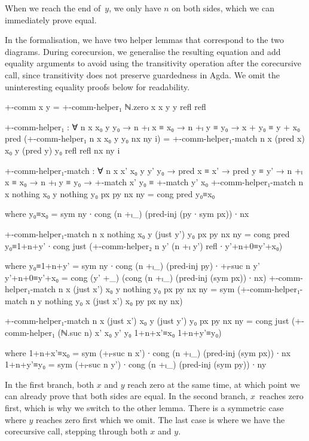 When we reach the end of~$y$, we only have $n$ on both sides, which we can
immediately prove equal.

In the formalisation, we have two helper lemmas that correspond to the two
diagrams. During corecursion, we generalise the resulting equation and add
equality arguments to avoid using the transitivity operation after the
corecursive call, since transitivity does not preserve guardedness in Agda. We omit
the uninteresting equality proofs below for readability.
\begin{AgdaSuppressSpace}
\begin{code}
  +-comm x y = +-comm-helper₁ ℕ.zero x x y y refl refl

  +-comm-helper₁ :
    ∀ n x x₀ y y₀ → n +ₗ x ≡ x₀ → n +ₗ y ≡ y₀ →
    x + y₀ ≡ y + x₀
  pred (+-comm-helper₁ n x x₀ y y₀ nx ny i) =
    +-comm-helper₁-match n x (pred x) x₀ y (pred y) y₀
      refl refl nx ny i

  +-comm-helper₁-match :
    ∀ n x x' x₀ y y' y₀ →
    pred x ≡ x' → pred y ≡ y' →
    n +ₗ x ≡ x₀ → n +ₗ y ≡ y₀ →
    +-match x' y₀ ≡ +-match y' x₀
  +-comm-helper₁-match
    n x nothing x₀ y nothing y₀ px py nx ny =
      cong pred y₀≡x₀
\end{code}
\begin{code}[hide]
      where
      y₀≡x₀ = sym ny ∙ cong (n +ₗ_) (pred-inj (py ∙ sym px)) ∙ nx
\end{code}
\begin{code}
  +-comm-helper₁-match
    n x nothing x₀ y (just y') y₀ px py nx ny =
      cong pred y₀≡1+n+y' ∙
      cong just
        (+-comm-helper₂ n y' (n +ₗ y') refl ∙ y'+n+0≡y'+x₀)
\end{code}
\begin{code}[hide]
    where
    y₀≡1+n+y' = sym ny ∙ cong (n +ₗ_) (pred-inj py) ∙ +ₗ-suc n y'
    y'+n+0≡y'+x₀ = cong (y' +_) (cong (n +ₗ_) (pred-inj (sym px)) ∙ nx)
  +-comm-helper₁-match
    n x (just x') x₀ y nothing y₀ px py nx ny =
      sym (+-comm-helper₁-match n y nothing y₀ x (just x') x₀ py px ny nx)
\end{code}
\begin{code}
  +-comm-helper₁-match
    n x (just x') x₀ y (just y') y₀ px py nx ny =
      cong just
        (+-comm-helper₁ (ℕ.suc n) x' x₀ y' y₀
          1+n+x'≡x₀ 1+n+y'≡y₀)
\end{code}
\begin{code}[hide]
    where
    1+n+x'≡x₀ = sym (+ₗ-suc n x') ∙ cong (n +ₗ_) (pred-inj (sym px)) ∙ nx
    1+n+y'≡y₀ = sym (+ₗ-suc n y') ∙ cong (n +ₗ_) (pred-inj (sym py)) ∙ ny
\end{code}
\end{AgdaSuppressSpace}
In the first branch, both $x$ and $y$ reach zero at the same time, at which
point we can already prove that both sides are equal. In the second branch,
$x$~reaches zero first, which is why we switch to the other lemma. There is a
symmetric case where $y$ reaches zero first which we omit. The last case is
where we have the corecursive call, stepping through both $x$ and $y$.

